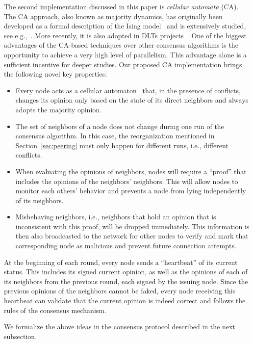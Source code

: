 \documentclass[../main.tex]{subfiles}
\begin{document}
\label{s_cellular}
The second implementation discussed in this paper is \textit{cellular automata} (CA). The CA approach, also known as majority dynamics, has originally been developed as a formal description of the Ising model~\cite{ising1925} and is extensively studied, see e.g.,~\cite{AbMo:15, Beetal16,  GaZe:18, MaRo:08, MoNeTa:13, Osetal:10, TaKiFu:96, WoOl:08}. More recently, it is also adopted in DLTs projects~\cite{nkn}.
One of the biggest advantages of the CA-based techniques over other consensus algorithms is the opportunity to achieve a very high level of parallelism.
This advantage alone is a sufficient incentive for deeper studies. Our proposed CA implementation brings the following novel key properties:
\begin{itemize}
    \item Every node acts as a cellular automaton~\cite{codd1968} that, in the presence of conflicts, changes its opinion only based on the state of its direct neighbors and always adopts the majority opinion. 
    \item The set of neighbors of a node does not change during one run of the consensus algorithm.
    In this case, the reorganization mentioned in Section~\ref{sec:peering} must only happen for different runs, i.e., different conflicts.
    \item When evaluating the opinions of neighbors, nodes will require a “proof” that includes the opinions of the neighbors' neighbors. This will allow nodes to monitor each others' behavior and prevents a node from lying independently of its neighbors.
    \item Misbehaving neighbors, i.e., neighbors that hold an opinion that is inconsistent with this proof, will be dropped immediately.
    This information is then also broadcasted to the network for other nodes to verify and mark that corresponding node as malicious and prevent future connection attempts.
\end{itemize}

At the beginning of each round, every node sends a ``heartbeat'' of its current status. 
This includes its signed current opinion, as well as the opinions of each of its neighbors from the previous round, each signed by the issuing node.
Since the previous opinions of the neighbors cannot be faked, every node receiving this heartbeat can validate that the current opinion is indeed correct and follows the rules of the consensus mechanism.

We formalize the above ideas in the consensus protocol described in the next subsection.
\end{document}
